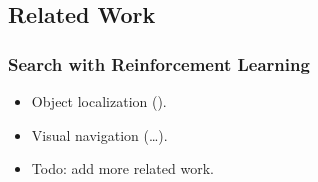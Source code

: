 \subsection{Related Work}

\begin{frame}
    \frametitle{Search with Reinforcement Learning}

    \begin{itemize}
        \item Object localization (\cite{caicedo_active_2015,ghesu_artificial_2016,chen_memory_2017}).
        \item Visual navigation (\dots).
        \item Todo: add more related work.
    \end{itemize}
\end{frame}